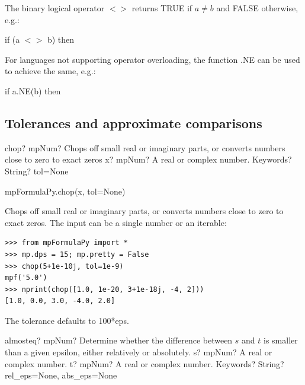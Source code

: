 \vspace{0.3cm}
The binary logical operator $\boldsymbol{<>}$ returns TRUE if  $a \neq b$ and FALSE otherwise, e.g.: 

\textsf{if (a $<>$ b) then}

For languages not supporting operator overloading, the function \textsf{.NE} can be used to achieve the same, e.g.: 

\textsf{if a.NE(b) then}



\subsection{Tolerances and approximate comparisons}



\begin{mpFunctionsExtract}
	\mpFunctionTwo
	{chop? mpNum? Chops off small real or imaginary parts, or converts numbers close to zero to exact zeros}
	{x? mpNum? A real or complex number.}
	{Keywords? String? tol=None}	
\end{mpFunctionsExtract}

\vspace{0.3cm}


mpFormulaPy.chop(x, tol=None)

\vpara
Chops off small real or imaginary parts, or converts numbers close to zero to exact zeros. The input can be a single number or an iterable:

\begin{lstlisting}
>>> from mpFormulaPy import *
>>> mp.dps = 15; mp.pretty = False
>>> chop(5+1e-10j, tol=1e-9)
mpf('5.0')
>>> nprint(chop([1.0, 1e-20, 3+1e-18j, -4, 2]))
[1.0, 0.0, 3.0, -4.0, 2.0]
\end{lstlisting}


The tolerance defaults to 100*eps.


\vspace{0.6cm}

\begin{mpFunctionsExtract}
	\mpFunctionThree
	{almosteq? mpNum? Determine whether the difference between $s$ and $t$ is smaller than a given epsilon, either relatively or absolutely.}
	{s? mpNum? A real or complex number.}
	{t? mpNum? A real or complex number.}	
	{Keywords? String? rel\_eps=None, abs\_eps=None}	
\end{mpFunctionsExtract}

